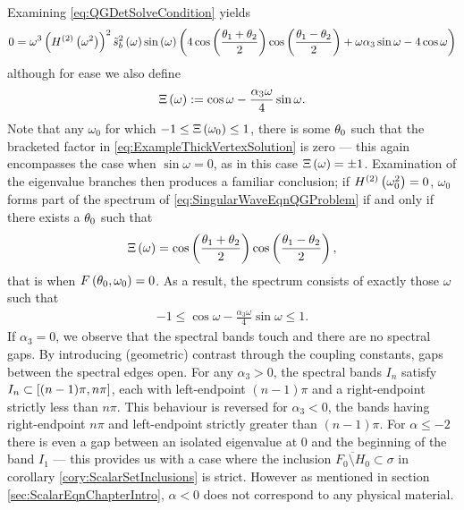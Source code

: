 Examining \eqref{eq:QGDetSolveCondition} yields
\begin{align} \label{eq:ExampleThickVertexSolution}
	0 = \omega^3 \left( H^{(2)}\left( \omega^2 \right) \right)^2 \tilde{s}_b^2\left( \omega \right) \sin\left( \omega \right) 
	\left(  4\cos\left( \frac{\theta_1+\theta_2}{2} \right)\cos\left( \frac{\theta_1-\theta_2}{2} \right) + \omega\alpha_3\sin\omega - 4\cos\omega  \right)
\end{align}
although for ease we also define
\begin{align*}
	\Xi\left( \omega \right) := \cos\omega - \frac{\alpha_3\omega}{4}\sin\omega.
\end{align*}
Note that any $\omega_0$ for which $-1\leq\Xi\left( \omega_0 \right)\leq 1$, there is some $\theta_0$ such that the bracketed factor in \eqref{eq:ExampleThickVertexSolution} is zero --- this again encompasses the case when $\sin\omega=0$, as in this case $\Xi\left( \omega \right) = \pm 1$.
Examination of the eigenvalue branches then produces a familiar conclusion; if $H^{(2)}\left( \omega_0^2 \right)=0$, $\omega_0$ forms part of the spectrum of \eqref{eq:SingularWaveEqnQGProblem} if and only if there exists a $\theta_0$ such that
\begin{align} \label{eq:ExampleThickVertexSolutionReduced}
	\Xi\left( \omega \right)=\cos\left( \frac{\theta_1+\theta_2}{2} \right)\cos\left( \frac{\theta_1-\theta_2}{2} \right),
\end{align}
that is when $F\left( \theta_0,\omega_0 \right)=0$.
As a result, the spectrum consists of exactly those $\omega$ such that
\begin{align*}
	-1 \leq \cos\omega - \frac{\alpha_3\omega}{4}\sin\omega \leq 1.
\end{align*}
If $\alpha_3=0$, we observe that the spectral bands touch and there are no spectral gaps.
By introducing (geometric) contrast through the coupling constants, gaps between the spectral edges open.
For any $\alpha_3>0$, the spectral bands $I_n$ satisfy $I_n\subset\left[ (n-1)\pi, n\pi \right]$, each with left-endpoint $(n-1)\pi$ and a right-endpoint strictly less than $n\pi$.
This behaviour is reversed for $\alpha_3<0$, the bands having right-endpoint $n\pi$ and left-endpoint strictly greater than $(n-1)\pi$.
For $\alpha\leq-2$ there is even a gap between an isolated eigenvalue at $0$ and the beginning of the band $I_1$ --- this provides us with a case where the inclusion $\overline{F_0\setminus H_0}\subset\sigma$ in corollary \ref{cory:ScalarSetInclusions} is strict.
However as mentioned in section \ref{sec:ScalarEqnChapterIntro}, $\alpha<0$ does not correspond to any physical material.

